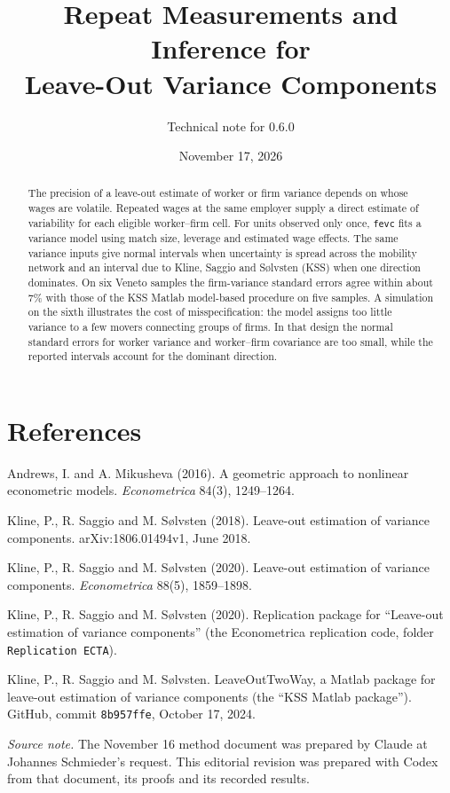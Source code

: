 \documentclass[11pt,letterpaper]{article}
\title{Repeat Measurements and Inference for\\ Leave-Out Variance Components}
\author{Technical note for \fevc{} 0.6.0}
\date{November 17, 2026}
\makeatletter
\newcommand{\fevc}{\texorpdfstring{\texttt{fevc}}{fevc}}
\newcommand{\code}[1]{\texttt{#1}}
\newcommand{\compactcontents}{\begingroup\small
  \renewcommand*\l@section{\@dottedtocline{1}{0em}{2em}}%
  \tableofcontents\endgroup}
\makeatother
\begin{document}
\maketitle
\begin{abstract}
The precision of a leave-out estimate of worker or firm variance depends on
whose wages are volatile. Repeated wages at the same employer supply a direct
estimate of variability for each eligible worker--firm cell. For units observed
only once, \fevc{} fits a variance model using match size, leverage and
estimated wage effects. The same variance inputs give normal intervals when
uncertainty is spread across the mobility network and an interval due to Kline,
Saggio and S{\o}lvsten (KSS) when one direction dominates. On six Veneto samples the firm-variance standard errors
agree within about 7\% with those of the KSS Matlab model-based procedure on five
samples. A simulation on the sixth illustrates the cost of misspecification:
the model assigns too little variance to a few movers connecting groups of
firms. In that design the normal standard errors for worker variance and
worker--firm covariance are too small, while the reported intervals account for
the dominant direction.
\end{abstract}
\compactcontents
\clearpage





\section*{References}
Andrews, I. and A. Mikusheva (2016). A geometric approach to nonlinear econometric models. \emph{Econometrica}
84(3), 1249--1264.

\noindent Kline, P., R. Saggio and M. S{\o}lvsten (2018). Leave-out estimation of variance components. arXiv:1806.01494v1,
June 2018.

\noindent Kline, P., R. Saggio and M. S{\o}lvsten (2020). Leave-out estimation of variance components.
\emph{Econometrica} 88(5), 1859--1898.

\noindent Kline, P., R. Saggio and M. S{\o}lvsten (2020). Replication package for ``Leave-out estimation of variance
components'' (the Econometrica replication code, folder \code{Replication ECTA}).

\noindent Kline, P., R. Saggio and M. S{\o}lvsten. LeaveOutTwoWay, a Matlab package for leave-out estimation of
variance components (the ``KSS Matlab package''). GitHub, commit \code{8b957ffe}, October 17, 2024.

\smallskip
\noindent\textit{Source note.} The November 16 method document was prepared by
Claude at Johannes Schmieder's request. This editorial revision was prepared
with Codex from that document, its proofs and its recorded results.
\clearpage
\appendix
\linespread{1.02}\selectfont

{\small}


{\small}
\end{document}
